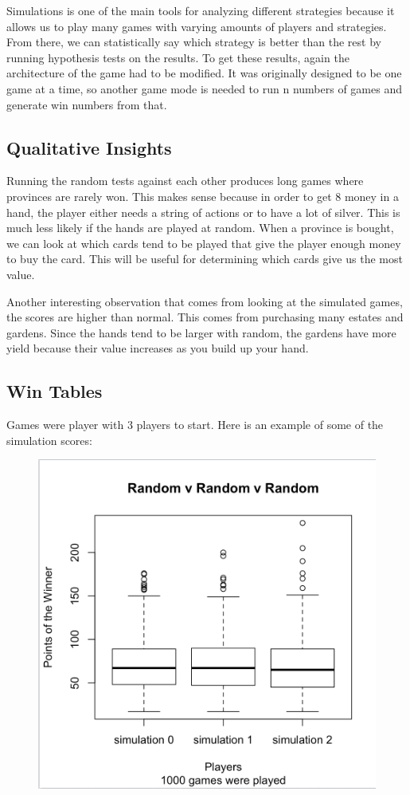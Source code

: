 \documentclass[11pt, oneside]{article}   	%
\begin{document}
Simulations is one of the main tools for analyzing different strategies because it allows us to play many games with varying amounts of players and strategies. From there, we can statistically say which strategy is better than the rest by running hypothesis tests on the results. To get these results, again the architecture of the game had to be modified. It was originally designed to be one game at a time, so another game mode is needed to run n numbers of games and generate win numbers from that. 

\subsection{Qualitative Insights}

Running the random tests against each other produces long games where provinces are rarely won. This makes sense because in order to get 8 money in a hand, the player either needs a string of actions or to have a lot of silver. This is much less likely if the hands are played at random. When a province is bought, we can look at which cards tend to be played that give the player enough money to buy the card. This will be useful for determining which cards give us the most value. 

Another interesting observation that comes from looking at the simulated games, the scores are higher than normal. This comes from purchasing many estates and gardens. Since the hands tend to be larger with random, the gardens have more yield because their value increases as you build up your hand.

\subsection{Win Tables}

Games were player with 3 players to start. Here is an example of some of the simulation scores: 

\begin{figure}[H]
\includegraphics[width=.75\textwidth]{random_random_random}
\centering
\end{figure}
\end{document}
